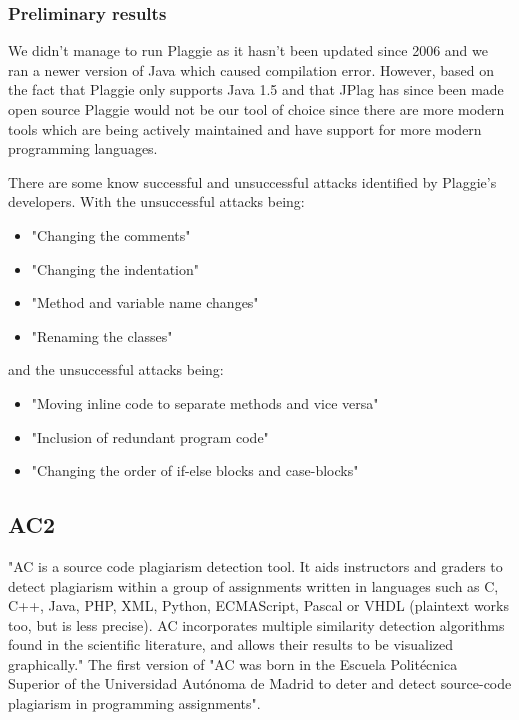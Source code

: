 \documentclass[a4paper, 11pt]{article}
\renewcommand{\\}{\vspace*{0.5\baselineskip} \newline}
\begin{document}
\subsubsection{Preliminary results}

We didn't manage to run Plaggie as it hasn't been updated since 2006 and we ran a newer version of Java which caused compilation error. However, based
on the fact that Plaggie only supports Java 1.5 and that JPlag has since been made open source Plaggie would not be our tool of choice since there are
more modern tools which are being actively maintained and have support for more modern programming languages.

There are some know successful and unsuccessful attacks identified by Plaggie's developers. With the unsuccessful attacks being:
\begin{itemize}
	\item "Changing the comments"
	\item "Changing the indentation"
	\item "Method and variable name changes"
	\item "Renaming the classes"
\end{itemize} \autocite*[Known successful attacks]{RMP}

and the unsuccessful attacks being:
\begin{itemize}
	\item "Moving inline code to separate methods and vice versa"
	\item "Inclusion of redundant program code"
	\item "Changing the order of if-else blocks and case-blocks"
\end{itemize}
\autocite[Known unsuccessful attacks]{RMP}

\newpage

\subsection{AC2}

"AC is a source code plagiarism detection tool. It aids instructors and graders to detect plagiarism within a group of assignments written in languages such as C, C++, Java, PHP, XML, Python, ECMAScript, Pascal or VHDL (plaintext works too, but is less precise). AC incorporates multiple similarity detection algorithms found in the scientific literature, and allows their results to be visualized graphically." \autocite{AC2} The first version of "AC was born in the Escuela Politécnica Superior of the Universidad Autónoma de Madrid to deter and detect source-code plagiarism in programming assignments". \autocite{AC2}
\end{document}
